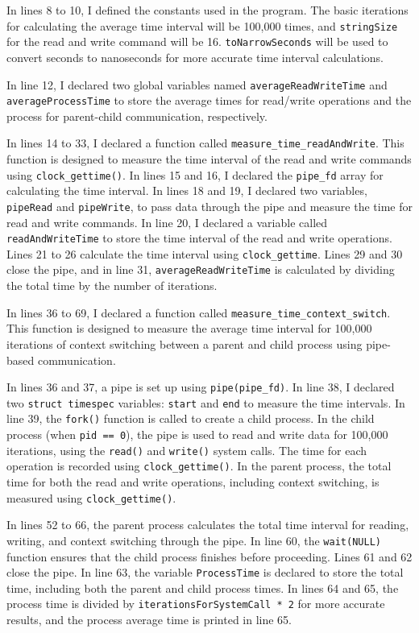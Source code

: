 \documentclass[10pt, answers]{exam}
\begin{document}
\begin{questions}
\begin{solution}
In lines 8 to 10, I defined the constants used in the program. The basic iterations for calculating the average time interval will be 100,000 times, and \texttt{stringSize} for the read and write command will be 16. \texttt{toNarrowSeconds} will be used to convert seconds to nanoseconds for more accurate time interval calculations.

In line 12, I declared two global variables named \texttt{averageReadWriteTime} and \texttt{averageProcessTime} to store the average times for read/write operations and the process for parent-child communication, respectively.

In lines 14 to 33, I declared a function called \texttt{measure\_time\_readAndWrite}. This function is designed to measure the time interval of the read and write commands using \texttt{clock\_gettime()}. In lines 15 and 16, I declared the \texttt{pipe\_fd} array for calculating the time interval. In lines 18 and 19, I declared two variables, \texttt{pipeRead} and \texttt{pipeWrite}, to pass data through the pipe and measure the time for read and write commands. In line 20, I declared a variable called \texttt{readAndWriteTime} to store the time interval of the read and write operations. Lines 21 to 26 calculate the time interval using \texttt{clock\_gettime}. Lines 29 and 30 close the pipe, and in line 31, \texttt{averageReadWriteTime} is calculated by dividing the total time by the number of iterations.

In lines 36 to 69, I declared a function called \texttt{measure\_time\_context\_switch}. This function is designed to measure the average time interval for 100,000 iterations of context switching between a parent and child process using pipe-based communication.

In lines 36 and 37, a pipe is set up using \texttt{pipe(pipe\_fd)}. In line 38, I declared two \texttt{struct timespec} variables: \texttt{start} and \texttt{end} to measure the time intervals. In line 39, the \texttt{fork()} function is called to create a child process. In the child process (when \texttt{pid == 0}), the pipe is used to read and write data for 100,000 iterations, using the \texttt{read()} and \texttt{write()} system calls. The time for each operation is recorded using \texttt{clock\_gettime()}. In the parent process, the total time for both the read and write operations, including context switching, is measured using \texttt{clock\_gettime()}.

In lines 52 to 66, the parent process calculates the total time interval for reading, writing, and context switching through the pipe. In line 60, the \texttt{wait(NULL)} function ensures that the child process finishes before proceeding. Lines 61 and 62 close the pipe. In line 63, the variable \texttt{ProcessTime} is declared to store the total time, including both the parent and child process times. In lines 64 and 65, the process time is divided by \texttt{iterationsForSystemCall * 2} for more accurate results, and the process average time is printed in line 65.


\end{solution}
\end{questions}
\end{document}
